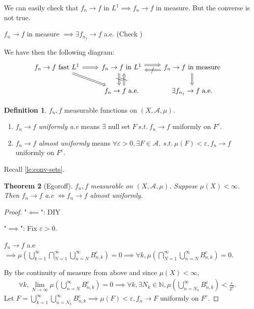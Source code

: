 \documentclass{report}
\newcommand{\N}{\mathbb{N}}
\newcommand{\st}{\ s.t.\ }
\newcommand{\cA}{\mathcal{A}}
\newtheorem{theorem}{Theorem}[chapter]
\theoremstyle{definition}
\newtheorem{definition}[theorem]{Definition}
\theoremstyle{remark}
\begin{document}
We can easily check that $f_n \to f$ in $L^1 \implies f_n \to f$ in measure. But the converse is not true.

$f_n \to f$ in measure $\implies \exists f_{n_j} \to f$ a.e. (Check \cite{follandRealAnalysisModern1999})

We have then the following diagram:
\[
	\begin{tikzcd}
	\text{$f_n \to f$ fast $L^1$} 
		\arrow[r, Rightarrow] 
		\arrow[dr, Rightarrow] 
		& \text{$f_n \to f$ in $L^1$} 
			\arrow[r, Rightarrow, shift left=1.5] 
			\arrow[r, "/" marking, Leftarrow, shift right=1.5] 
				& \text{$f_n \to f$ in measure}  \\
		& \text{$f_n \to f$ a.e.}  \arrow[u, "/" marking, Leftarrow, shift left=1.5] \arrow[u, "/" marking, Rightarrow, shift right=1.5] & \text{$\exists f_{n_j} \to f$ a.e.}  \arrow[u, Leftarrow]
	\end{tikzcd}
\]

\begin{definition}
	$f_n, f$ measurable functions on $(X, \cA, \mu)$.
	\begin{enumerate}
		\item $f_n \to f$ \emph{uniformly a.e} means $\exists$ null set $F \st f_n \to f$ uniformly on $F^c$.
		\item $f_n \to f$ \emph{almost uniformly} means $\forall \varepsilon > 0, \exists F \in \cA, \st \mu(F) < \varepsilon, f_n \to f$ uniformly on $F^c$.
	\end{enumerate}
\end{definition}
Recall \ref{le:conv-sets}.


\begin{theorem}[Egoroff]
	$f_n, f$ measurable on $(X, \cA, \mu)$. Suppose $\mu(X) < \infty$. Then $f_n \to f$ a.e $\iff f_n \to f$ almost uniformly.
\end{theorem}
\begin{proof}
	"$\impliedby$": DIY
	
	"$\implies$": Fix $\varepsilon > 0$.

	$f_n \to f$ a.e $\implies \displaystyle \mu\left(\bigcup_{k = 1}^\infty \bigcap_{N = 1}^\infty \bigcup_{n = N}^\infty B^c_{n, k}\right) = 0 \implies \forall k, \mu\left(\bigcap_{N = 1}^\infty \bigcup_{n = N}^\infty B^c_{n, k}\right) = 0$.

	By the continuity of measure from above and since $\mu(X) < \infty$, 
	\begin{align*}
		\forall k, \lim_{N \to \infty} \mu\left(\bigcup_{n = N}^\infty B^c_{n, k}\right) = 0 \implies \forall k, \exists N_k \in \N, \mu\left(\bigcup_{n = N_k}^\infty B^c_{n, k}\right) < \frac{\varepsilon}{2^k}.
	\end{align*}
	Let $\displaystyle F = \bigcup_{k = 1}^\infty \bigcup_{n = N_k}^\infty B^c_{n, k} \implies \mu(F) < \varepsilon, f_n \to F$ uniformly on $F^c$.
\end{proof}
\end{document}
